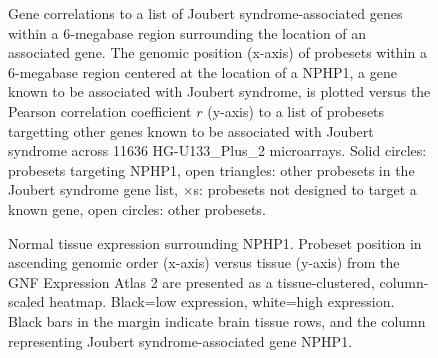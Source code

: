\documentclass{bioinfo}
\begin{document}


\begin{figure}[!tpb]
\label{figure:NPHP1}
\centerline{}
\caption{Gene correlations to a list of Joubert syndrome-associated genes within a
6-megabase region surrounding the location of an associated gene.  The genomic
position (x-axis) of probesets within a 6-megabase region centered at the
location of a NPHP1, a gene known to be associated with Joubert syndrome, is
plotted versus the Pearson correlation coefficient $r$ (y-axis) to a list of
probesets targetting other genes known to be associated with Joubert syndrome
across 11636 HG-U133\_Plus\_2 microarrays.  Solid circles: probesets targeting
NPHP1, open triangles: other probesets in the Joubert syndrome gene list,
$\times$s: probesets not designed to target a known gene, open circles: other
probesets.}
\end{figure}

\begin{figure}[!tpb]
\label{figure:GeneAtlas}
\centerline{}
\caption{Normal tissue expression surrounding NPHP1.  Probeset position in
ascending genomic order (x-axis) versus tissue (y-axis) from the GNF Expression
Atlas 2 are presented as a tissue-clustered, column-scaled heatmap.  Black=low
expression, white=high expression.  Black bars in the margin indicate brain
tissue rows, and the column representing Joubert syndrome-associated gene
NPHP1.}
\end{figure}





\end{document}
